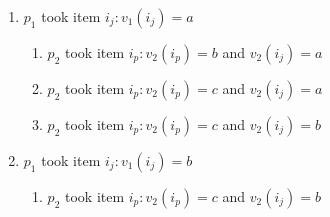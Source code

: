 \documentclass{article}
\begin{document}
\begin{enumerate}
    \item $p_1$ took item $i_j: v_1(i_j) = a$
    \begin{enumerate}
        \item $p_2$ took item $i_p:v_2(i_p) = b$ and $v_2(i_j) = a$ 
        \item $p_2$ took item $i_p: v_2(i_p) = c$ and $v_2(i_j) = a$
        \item $p_2$ took item $i_p: v_2(i_p) = c$ and $v_2(i_j) = b$
    \end{enumerate}
    \item $p_1$ took item $i_j: v_1(i_j) = b$
    \begin{enumerate}
        \item $p_2$ took item $i_p: v_2(i_p) = c$ and $v_2(i_j) = b$
    \end{enumerate}
\end{enumerate}
\end{document}
